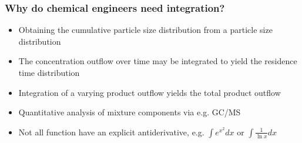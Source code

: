 \documentclass[11pt,table,final,fleqn,xcolor={usenames,dvipsnames,table},handout]{beamer}
\begin{document}
\begin{frame}
  \frametitle{Why do chemical engineers need integration?}
  \begin{itemize}
     \item Obtaining the cumulative particle size distribution from a particle size distribution
     \item The concentration outflow over time may be integrated to yield the residence time distribution
     \item Integration of a varying product outflow yields the total product outflow
     \item Quantitative analysis of mixture components via e.g. GC/MS
     \item Not all function have an explicit antiderivative, e.g. $\int e^{x^2} dx$ or $\int \frac{1}{\ln x}dx$
  \end{itemize}
\end{frame}
\end{document}
